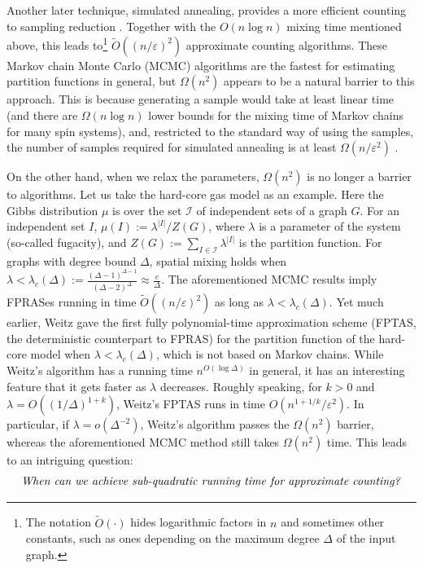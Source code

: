 \documentclass[10pt,a4paper]{article}
\def\+#1{\mathcal{#1}}
\newcommand{\abs}[1]{\ensuremath{\left\vert#1\right\vert}}
\newcommand{\eps}{\varepsilon}
\newcommand{\defeq}{:=}
\begin{document}
Another later technique, simulated annealing, provides a more efficient counting to sampling reduction \cite{SVV09,Hub15,Kol18}.
Together with the $O(n\log n)$ mixing time mentioned above, this leads to\footnote{The notation $\widetilde{O}(\cdot)$ hides logarithmic factors in $n$ and sometimes other constants, such as ones depending on the maximum degree $\Delta$ of the input graph.} $\widetilde{O}((n/\eps)^2)$ approximate counting algorithms. %
These Markov chain Monte Carlo (MCMC) algorithms are the fastest for estimating partition functions in general,
but $\Omega(n^2)$ appears to be a natural barrier to this approach.
This is because generating a sample would take at least linear time (and there are $\Omega(n\log n)$ lower bounds for the mixing time of Markov chains \cite{HS07} for many spin systems),
and, restricted to the standard way of using the samples, the number of samples required for simulated annealing is at least $\Omega(n/\eps^2)$ \cite[Theorem~10]{Kol18}.

On the other hand, when we relax the parameters, $\Omega(n^2)$ is no longer a barrier to algorithms.
Let us take the hard-core gas model as an example. 
Here the Gibbs distribution $\mu$ is over the set $\+I$ of independent sets of a graph $G$.
For an independent set $I$, $\mu(I)\defeq\lambda^{\abs{I}}/Z(G)$, where $\lambda$ is a parameter of the system (so-called fugacity),
and $Z(G)\defeq\sum_{I\in\+I} \lambda^{\abs{I}}$ is the partition function.
For graphs with degree bound $\Delta$, spatial mixing holds when $\lambda<\lambda_c(\Delta) \defeq \frac{(\Delta-1)^{\Delta-1}}{(\Delta-2)^{\Delta}} \approx\frac{e}{\Delta}$.
The aforementioned MCMC results \cite{CLV21,CFYZ22,CE22} imply FPRASes running in time $\widetilde{O}((n/\varepsilon)^2)$ as long as $\lambda<\lambda_c(\Delta)$. 
Yet much earlier, Weitz \cite{Wei06} gave the first fully polynomial-time approximation scheme (FPTAS, the deterministic counterpart to FPRAS) for the partition function of the hard-core model when $\lambda<\lambda_c(\Delta)$, which is not based on Markov chains.
While Weitz's algorithm has a running time $n^{O(\log \Delta)}$ in general,
it has an interesting feature that it gets faster as $\lambda$ decreases. 
Roughly speaking, for $k>0$ and $\lambda=O((1/\Delta)^{1+k})$,
Weitz's FPTAS runs in time $O(n^{1+1/k}/\eps^2)$.
In particular, if $\lambda=o(\Delta^{-2})$, Weitz's algorithm passes the $\Omega(n^2)$ barrier,
whereas the aforementioned MCMC method still takes $\Omega(n^2)$ time.
This leads to an intriguing question:
\begin{align}\label{question}
  \text{\emph{When can we achieve sub-quadratic running time for approximate counting?}}
\end{align}
\end{document}
